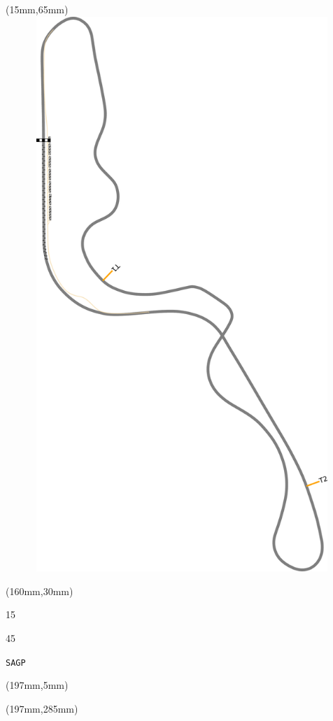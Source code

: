\begin{textblock*}{185mm}(15mm,65mm)%
\centering
\mbox{\includegraphics[width=185mm,height=210mm,keepaspectratio]{PT/SAGP.pdf}}
\end{textblock*}
\begin{textblock*}{40mm}(160mm,30mm)%
\Large
\par{} 
\par15 
\par45 
\par\hfill\tiny\tt SAGP\\
\end{textblock*}
\begin{textblock*}{20mm}(197mm,5mm)%
\fbox{\thepage}
\label{SAGP}
\end{textblock*}
\begin{textblock*}{20mm}(197mm,285mm)%
\fbox{\thepage}
\end{textblock*}

